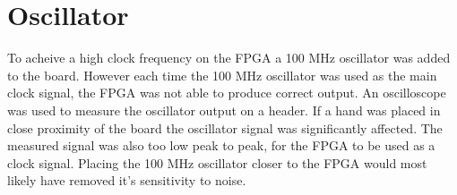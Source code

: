 \section{Oscillator}
To acheive a high clock frequency on the FPGA a 100 MHz oscillator was added to the board.
However each time the 100 MHz oscillator was used as the main clock signal,
the FPGA was not able to produce correct output.
An oscilloscope was used to measure the oscillator output on a header.
If a hand was placed in close proximity of the board the oscillator signal was significantly affected.
The measured signal was also too low peak to peak, for the FPGA to be used as a clock signal.
Placing the 100 MHz oscillator closer to the FPGA would most likely have removed it's sensitivity to noise.
